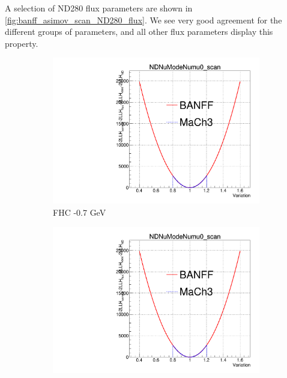 A selection of ND280 flux parameters are shown in \autoref{fig:banff_asimov_scan_ND280_flux}. We see very good agreement for the different groups of parameters, and all other flux parameters display this property.
\begin{figure}[h]
	\begin{subfigure}[t]{0.24\textwidth}
		\includegraphics[width=\textwidth, trim={0mm 0mm 0mm 11mm}, clip, page=4]{figures/mach3/banff/Asimov_scan_20July_flux_Full_LLHscan_18July_BeRPA_U_ND280logL_scan}
		\caption{FHC -0.7 GeV}
	\end{subfigure}
	\begin{subfigure}[t]{0.24\textwidth}
		\includegraphics[width=\textwidth, trim={0mm 0mm 0mm 11mm}, clip, page=19]{figures/mach3/banff/Asimov_scan_20July_flux_Full_LLHscan_18July_BeRPA_U_ND280logL_scan}

\end{subfigure}
\end{figure}
